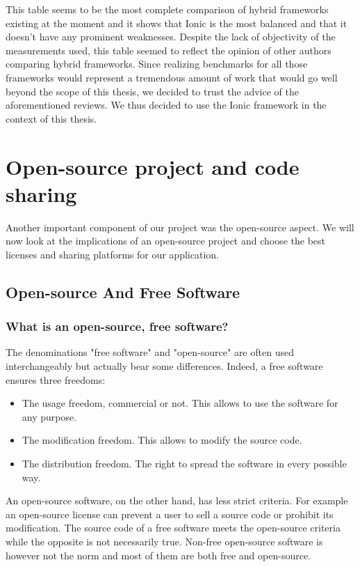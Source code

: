 \documentclass{eplmastersthesis}
\begin{document}
This table seems to be the most complete comparison of hybrid frameworks existing at the moment and it shows that Ionic is the most balanced and that it doesn't have any prominent weaknesses. Despite the lack of objectivity of the measurements used, this table seemed to reflect the opinion of other authors comparing hybrid frameworks. Since realizing benchmarks for all those frameworks would represent a tremendous amount of work that would go well beyond the scope of this thesis, we decided to trust the advice of the aforementioned reviews. We thus decided to use the Ionic framework in the context of this thesis.
\section{Open-source project and code sharing}

Another important component of our project was the open-source aspect. We will now look at the implications of an open-source project and choose the best licenses and sharing platforms for our application. 

\subsection{Open-source And Free Software}
\subsubsection{What is an open-source, free software?}
The denominations "free software" and "open-source" are often used interchangeably but actually bear some differences. Indeed, a free software ensures three freedoms:
\begin{itemize}
\item The usage freedom, commercial or not. This allows to use the software for any purpose.
\item The modification freedom. This allows to modify the source code.
\item The distribution freedom. The right to spread the software in every possible way.   	 
\end{itemize} 
An open-source software, on the other hand, has less strict criteria. For example an open-source license can prevent a user to sell a source code or prohibit its modification. The source code of a free software meets the open-source criteria while the opposite is not necessarily true. Non-free open-source software is however not the norm and most of them are both free and open-source.\\
\end{document}

